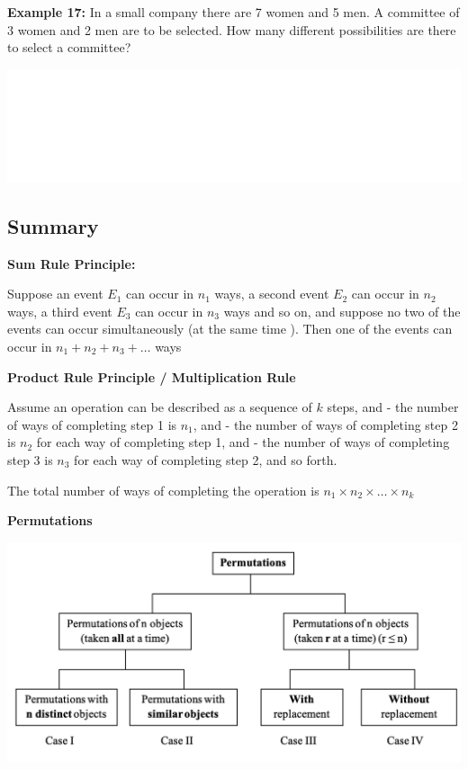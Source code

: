 \documentclass[]{book}
\begin{document}
\textbf{Example 17:} In a small company there are 7 women and 5 men. A committee of 3 women and 2 men are to be selected. How many different possibilities are there to select a committee?

\begin{center}\includegraphics[width=1\linewidth]{figure/box893-1} \end{center}

\newpage

\hypertarget{summary}{%
\subsection*{Summary}\label{summary}}

\textbf{Sum Rule Principle:}

Suppose an event \(E_1\) can occur in \(n_1\) ways, a second event \(E_2\) can occur in \(n_2\) ways, a third event \(E_3\) can occur in \(n_3\) ways and so on, and suppose no two of the events can occur simultaneously (at the same time ).
Then one of the events can occur in \(n_1 + n_2 + n_3 + \dots\) ways

\textbf{Product Rule Principle / Multiplication Rule}

Assume an operation can be described as a sequence of \(k\) steps, and
- the number of ways of completing step 1 is \(n_1\), and
- the number of ways of completing step 2 is \(n_2\) for each way of completing step 1, and
- the number of ways of completing step 3 is \(n_3\) for each way of completing step 2, and so forth.

The total number of ways of completing the operation is \(n_1 \times n_2 \times \dots \times n_k\)

\textbf{Permutations}

\begin{center}\includegraphics[width=1\linewidth]{figure/Permutations} \end{center}
\end{document}
